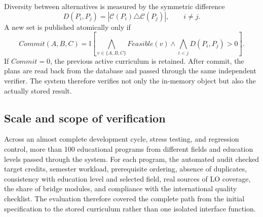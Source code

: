 \documentclass[twoside,11pt]{article}
\begin{document}
Diversity between alternatives is measured by the symmetric difference
\begin{equation}
D(P_i,P_j)=|\mathcal{C}(P_i)\triangle\mathcal{C}(P_j)|,
\qquad i\ne j.
\label{eq:variant-diversity}
\end{equation}
A new set is published atomically only if
\begin{equation}
Commit(A,B,C)=\mathbb{I}\left[
\bigwedge_{v\in\{A,B,C\}} Feasible(v)\land
\bigwedge_{i<j}D(P_i,P_j)>0\right].
\label{eq:transactional-commit}
\end{equation}
If $Commit=0$, the previous active curriculum is retained. After commit, the plans are read back from the database and passed through the same independent verifier. The system therefore verifies not only the in-memory object but also the actually stored result.

\subsection{Scale and scope of verification}

Across an almost complete development cycle, stress testing, and regression control, more than 100 educational programs from different fields and education levels passed through the system. For each program, the automated audit checked target credits, semester workload, prerequisite ordering, absence of duplicates, consistency with education level and selected field, real sources of LO coverage, the share of bridge modules, and compliance with the international quality checklist. The evaluation therefore covered the complete path from the initial specification to the stored curriculum rather than one isolated interface function.
\end{document}
